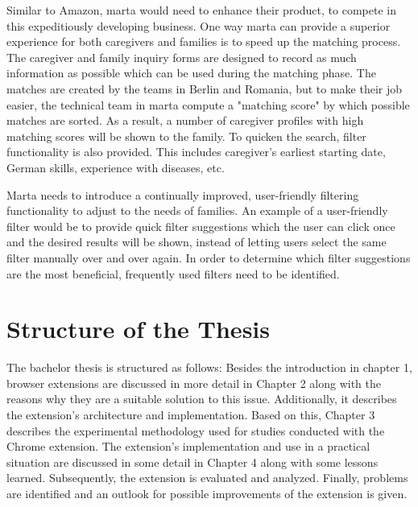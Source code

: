 Similar to Amazon, marta would need to enhance their product, to compete in this expeditiously developing business. One way marta can provide a superior experience for both caregivers and families is to speed up the matching process. The caregiver and family inquiry forms are designed to record as much information as possible which can be used during the matching phase. The matches are created by the teams in Berlin and Romania, but to make their job easier, the technical team in marta compute a "matching score" by which possible matches are sorted. As a result, a number of caregiver profiles with high matching scores will be shown to the family. To quicken the search, filter functionality is also provided. This includes caregiver's earliest starting date, German skills, experience with diseases, etc.

Marta needs to introduce a continually improved, user-friendly filtering functionality to adjust to the needs of families. An example of a user-friendly filter would be to provide quick filter suggestions which the user can click once and the desired results will be shown, instead of letting users select the same filter manually over and over again. In order to determine which filter suggestions are the most beneficial, frequently used filters need to be identified.

\section{Structure of the Thesis}

The bachelor thesis is structured as follows: Besides the introduction in chapter 1, browser extensions are discussed in more detail in Chapter 2 along with the reasons why they are a suitable solution to this issue. Additionally, it describes the extension's architecture and implementation. Based on this, Chapter 3 describes the experimental methodology used for studies conducted with the Chrome extension. The extension's implementation and use in a practical situation are discussed in some detail in Chapter 4 along with some lessons learned. Subsequently, the extension is evaluated and analyzed. Finally, problems are identified and an outlook for possible improvements of the extension is given.
